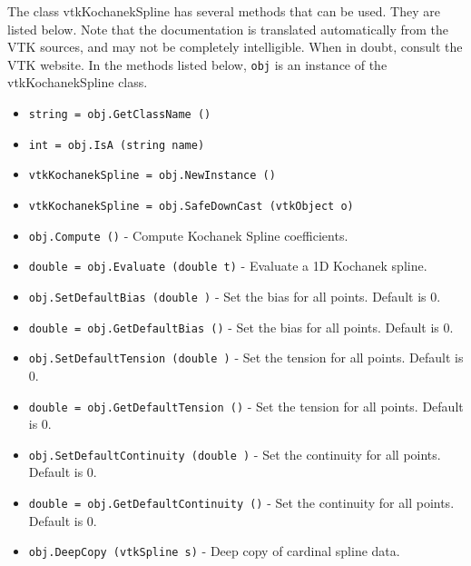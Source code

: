 The class vtkKochanekSpline has several methods that can be used.
  They are listed below.
Note that the documentation is translated automatically from the VTK sources,
and may not be completely intelligible.  When in doubt, consult the VTK website.
In the methods listed below, \verb|obj| is an instance of the vtkKochanekSpline class.
\begin{itemize}
\item  \verb|string = obj.GetClassName ()|

\item  \verb|int = obj.IsA (string name)|

\item  \verb|vtkKochanekSpline = obj.NewInstance ()|

\item  \verb|vtkKochanekSpline = obj.SafeDownCast (vtkObject o)|

\item  \verb|obj.Compute ()| -  Compute Kochanek Spline coefficients.

\item  \verb|double = obj.Evaluate (double t)| -  Evaluate a 1D Kochanek spline.

\item  \verb|obj.SetDefaultBias (double )| -  Set the bias for all points. Default is 0.

\item  \verb|double = obj.GetDefaultBias ()| -  Set the bias for all points. Default is 0.

\item  \verb|obj.SetDefaultTension (double )| -  Set the tension for all points. Default is 0.

\item  \verb|double = obj.GetDefaultTension ()| -  Set the tension for all points. Default is 0.

\item  \verb|obj.SetDefaultContinuity (double )| -  Set the continuity for all points. Default is 0.

\item  \verb|double = obj.GetDefaultContinuity ()| -  Set the continuity for all points. Default is 0.

\item  \verb|obj.DeepCopy (vtkSpline s)| -  Deep copy of cardinal spline data.

\end{itemize}
